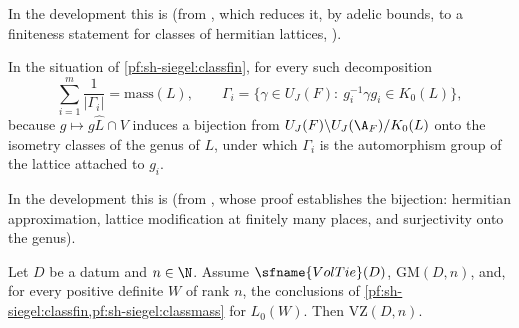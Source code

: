 In the development this is 
(from , which reduces it, by adelic bounds, to a finiteness statement for classes of
hermitian lattices, ).

\begin{littheorem}\label{pf:sh-siegel:classmass}
In the situation of \cref{pf:sh-siegel:classfin}, for every such decomposition
\[
\sum_{i=1}^m\frac1{|\Gamma_i|}=\mathrm{mass}(L),\qquad\Gamma_i=\{\gamma\in U_J(F):\ g_i^{-1}\gamma g_i\in K_0(L)\},
\]
because $g\mapsto g\widehat L\cap V$ induces a bijection from $U_J(F)\backslash U_J(\A_F)/K_0(L)$ onto the isometry classes of
the genus of $L$, under which $\Gamma_i$ is the automorphism group of the lattice attached to $g_i$.
\end{littheorem}

In the development this is  (from
, whose proof establishes the bijection: hermitian approximation, lattice
modification at finitely many places, and surjectivity onto the genus).

\begin{proposition}\label{pf:sh-siegel:volclass}
Let $D$ be a datum and $n\in\N$. Assume $\sfname{VolTie}(D)$, $\mathrm{GM}(D,n)$, and, for every positive definite $W$ of rank
$n$, the conclusions of \cref{pf:sh-siegel:classfin,pf:sh-siegel:classmass} for $L_0(W)$. Then $\mathrm{VZ}(D,n)$.
\end{proposition}

